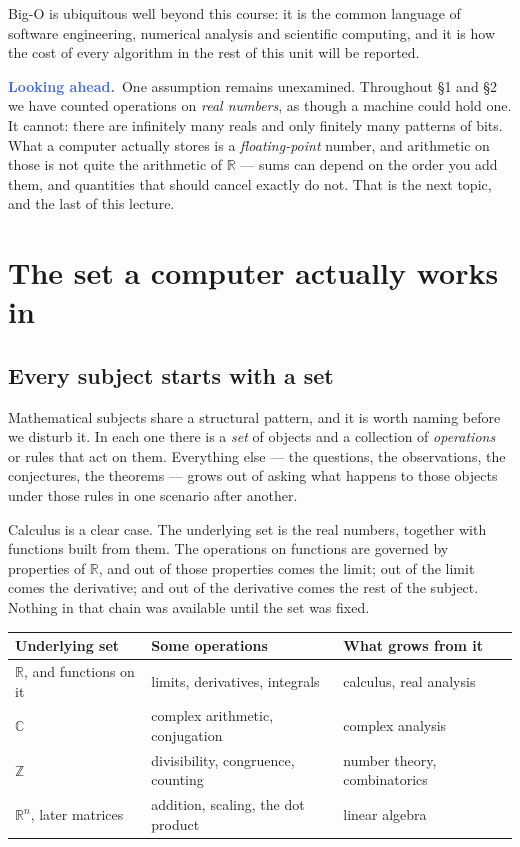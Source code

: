 \documentclass[11pt]{article}
\theoremstyle{plain}
\theoremstyle{definition}
\theoremstyle{remark}
\newcommand{\lookahead}{\par\smallskip\noindent
  \textbf{\sffamily\textcolor{RoyalBlue}{Looking ahead.}}\ \ignorespaces}
\newcommand{\R}{\mathbb{R}}
\newcommand{\C}{\mathbb{C}}
\newcommand{\Z}{\mathbb{Z}}
\begin{document}
\noindent Big-O is ubiquitous well beyond this course: it is the common language
of software engineering, numerical analysis and scientific computing, and it is
how the cost of every algorithm in the rest of this unit will be reported.

\lookahead One assumption remains unexamined. Throughout \S1 and \S2 we have
counted operations on \emph{real numbers}, as though a machine could hold one.
It cannot: there are infinitely many reals and only finitely many patterns of
bits. What a computer actually stores is a \emph{floating-point} number, and
arithmetic on those is not quite the arithmetic of $\R$ --- sums can depend on
the order you add them, and quantities that should cancel exactly do not. That
is the next topic, and the last of this lecture.

\section{The set a computer actually works in}
\subsection{Every subject starts with a set}
Mathematical subjects share a structural pattern, and it is worth naming before
we disturb it. In each one there is a \emph{set} of objects and a collection of
\emph{operations} or rules that act on them. Everything else --- the questions,
the observations, the conjectures, the theorems --- grows out of asking what
happens to those objects under those rules in one scenario after another.

Calculus is a clear case. The underlying set is the real numbers, together with
functions built from them. The operations on functions are governed by
properties of $\R$, and out of those properties comes the limit; out of the
limit comes the derivative; and out of the derivative comes the rest of the
subject. Nothing in that chain was available until the set was fixed.

\begin{center}
\renewcommand{\arraystretch}{1.35}
\begin{tabular}{@{}l l l@{}}
\toprule
\textbf{Underlying set} & \textbf{Some operations} & \textbf{What grows from it} \\
\midrule
$\R$, and functions on it & limits, derivatives, integrals & calculus, real analysis \\
$\C$                      & complex arithmetic, conjugation & complex analysis \\
$\Z$                      & divisibility, congruence, counting & number theory, combinatorics \\
$\R^{n}$, later matrices  & addition, scaling, the dot product & linear algebra \\
\bottomrule
\end{tabular}
\end{center}
\end{document}
